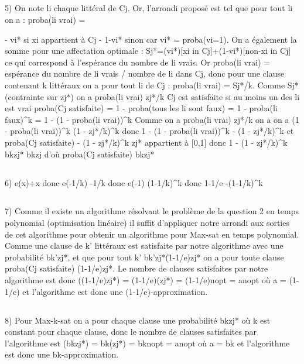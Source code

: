 \documentclass{article}
\begin{document}
\subsection{}
5) On note li chaque littéral de Cj.
Or, l'arrondi proposé est tel que pour tout li on a : proba(li vrai) = {- vi* si xi appartient à Cj
- 1-vi* sinon
car vi* = proba(vi=1).
On a également la somme pour une affectation optimale : Sj*=\sum(vi*)[xi in Cj]+\sum(1-vi*)[non-xi in Cj] ce qui correspond à l'espérance du nombre de li vrais.
Or proba(li vrai) = espérance du nombre de li vrais / nombre de li dans Cj, donc pour une clause contenant k littéraux on a pour tout li de Cj : proba(li vrai) = Sj*/k.
Comme Sj*\geqzj* (contrainte sur zj*) on a proba(li vrai) \geq zj*/k
Cj est satisfaite si au moins un des li est vrai \Rightarrow proba(Cj satisfaite) = 1 - proba(tous les li sont faux) = 1 - proba(li faux)^k = 1 - (1 - proba(li vrai))^k
Comme on a proba(li vrai) \geq zj*/k on a
on a		(1 - proba(li vrai))^k	\leq (1 - zj*/k)^k
donc	    1 - (1 - proba(li vrai))^k	 - (1 - zj*/k)^k
et		  proba(Cj satisfaite)	 - (1 - zj*/k)^k
zj* appartient à [0,1] donc 1 - (1 - zj*/k)^k \geq bk\times zj* \geq bk\times zj
d'où proba(Cj satisfaite) \geq bk\times zj*
\subsection{}
6) e(x)+x donc e(-1/k) -1/k donc e(-1) \geq (1-1/k)^k donc 1-1/e -(1-1/k)^k
\subsection{}
7) Comme il existe un algorithme résolvant le problème de la question 2 en temps polynomial (optimisation linéaire) il suffit d'appliquer notre arrondi aux sorties de cet algorithme pour obtenir un algorithme pour Max-sat en temps polynomial.
Comme une clause de k' littéraux est satisfaite par notre algorithme avec une probabilité \geq bk'\times zj*, et que pour tout k' bk'\times zj*\geq(1-1/e)\times zj* on a pour toute clause proba(Cj satisfaite) \geq (1-1/e)\times zj*. Le nombre de clauses satisfaites par notre algorithme est donc \geq \sum((1-1/e)\times zj*) = (1-1/e)\times \sum(zj*) = (1-1/e)\times nopt = a\times nopt où a = (1-1/e) et l'algorithme est donc une (1-1/e)-approximation.
\subsection{}
8) Pour Max-k-sat on a pour chaque clause une probabilité \geq bk\times zj* où k est constant pour chaque clause, donc le nombre de clauses satisfaites par l'algorithme est \geq \sum(bk\times zj*) = bk\times \sum(zj*) = bk\times nopt = a\times nopt où a = bk et l'algorithme est donc une bk-approximation.

}
\end{document}
